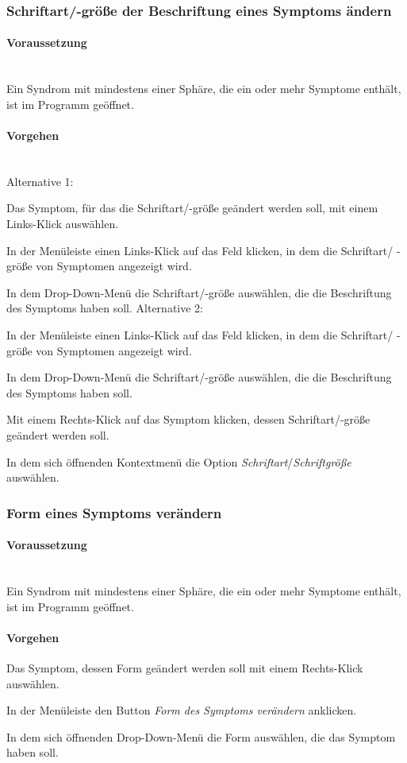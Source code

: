 \documentclass[enabledeprecatedfontcommands,fontsize=11pt,paper=a4,twoside]{scrartcl}
\newcommand*{\condition}{\paragraph{Voraussetzung}$\;$ \vspace{0.2cm}\\}
\newcommand*{\actions}{\paragraph{Vorgehen} $\;$\vspace{0.2cm}\\}
\newcommand*{\action}{\paragraph{Vorgehen}}
\newcommand*{\aOne}{\textcolor{bbe}{Alternative 1:}}
\newcommand*{\aTwo}{\textcolor{bbe}{Alternative 2:}}
\let\origenumerate\enumerate
\let\origendenumerate\endenumerate
\renewenvironment{enumerate}{\origenumerate \addtolength{\itemsep}{-10.0pt}}{\origendenumerate}
\begin{document}
\subsubsection{Schriftart/-größe der Beschriftung eines Symptoms ändern}
		\condition 	
		Ein Syndrom mit mindestens einer Sphäre, die ein oder mehr Symptome enthält, ist im Programm geöffnet. 
		\actions  
		\aOne
		\begin{enumerate}
			\item Das Symptom, für das die Schriftart/-größe geändert werden soll, mit einem Links-Klick auswählen.
			\item In der Menüleiste einen Links-Klick auf das Feld klicken, in dem die Schriftart/ -größe von Symptomen angezeigt wird. 
			\item In dem Drop-Down-Menü die Schriftart/-größe auswählen, die die Beschriftung des Symptoms haben soll.
		\end{enumerate}
		\aTwo
			\begin{enumerate}
			\item In der Menüleiste einen Links-Klick auf das Feld klicken, in dem die Schriftart/ -größe von Symptomen angezeigt wird. 
			\item In dem Drop-Down-Menü die Schriftart/-größe auswählen, die die Beschriftung des Symptoms haben soll.
			\item Mit einem Rechts-Klick auf das Symptom klicken, dessen Schriftart/-größe geändert werden soll.
			\item In dem sich öffnenden Kontextmenü die Option \textit{Schriftart}/\textit{Schriftgröße} auswählen.
		\end{enumerate}
			
\subsubsection{Form eines Symptoms verändern}
		\condition 	
		Ein Syndrom mit mindestens einer Sphäre, die ein oder mehr Symptome enthält, ist im Programm geöffnet. 
		\action
		\begin{enumerate}
			\item Das Symptom, dessen Form geändert werden soll mit einem Rechts-Klick auswählen. 
			\item In der Menüleiste den Button \textit{Form des Symptoms verändern} anklicken.
			\item In dem sich öffnenden Drop-Down-Menü die Form auswählen, die das Symptom haben soll. \\
		\end{enumerate}
	
\end{document}
